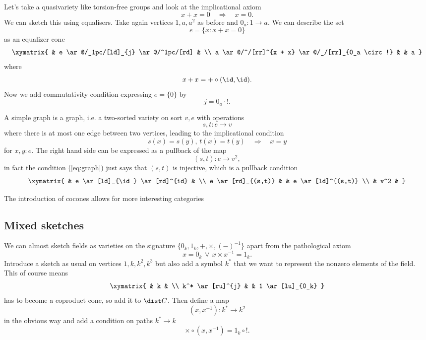 \begin{Example}
Let's take a quasivariety like torsion-free groups and look at the implicational axiom
\[ x + x = 0 \quad \Rightarrow \quad x = 0. \]
We can sketch this using equalisers. Take again vertices $1,a,a^2$ as before and $0_a : 1 \to a$. We can describe the set
\[ e = \{ x : x + x = 0 \} \]
as an equalizer cone
\[
\xymatrix{
& e \ar@/_1pc/[ld]_{j} \ar@/^1pc/[rd] & \\
a \ar@/^/[rr]^{x + x} \ar@/_/[rr]_{0_a \circ !} & & a
}\]
where \[ x + x = + \circ (\id,\id). \]
Now we add commutativity condition expressing $e = \{0\}$ by \[ j = 0_a\cdot !. \]
\end{Example}

\begin{Example}
A simple graph is a graph, i.e. a two-sorted variety on sort $v,e$ with operations
\[ s, t : e \to v \]
where there is at most one edge between two vertices, leading to the implicational condition
\begin{equation}\label{eq:graph} s(x) = s(y),\, t(x) = t(y) \quad \Rightarrow \quad x = y \end{equation}
for $x,y : e$. The right hand side can be expressed as a pullback of the map \[ (s,t) : e \to v^2, \]
in fact the condition (\ref{eq:graph}) just says that $(s,t)$ is injective, which is a pullback condition
\[
\xymatrix{
 & e \ar[ld]_{\id} \ar[rd]^{id} & \\
e \ar[rd]_{(s,t)} &  & e \ar[ld]^{(s,t)} \\
 & v^2 &
}\]
\end{Example}

The introduction of cocones allows for more interesting categories
\subsection{Mixed sketches}

\begin{Example}[Fields]
We can almost sketch fields as varieties on the signature $\{0_k,1_k,+,\times,(-)^{-1}\}$ apart from the pathological axiom
\[ x = 0_k \,\vee\,x \times x^{-1} = 1_k. \] 
Introduce a sketch as usual on vertices $1,k,k^2,k^3$ but also add a symbol $k^*$ that we want to represent the nonzero elements of the field. This of course means
\[
\xymatrix{
& k & \\
k^* \ar[ru]^{j} & & 1 \ar[lu]_{0_k}
}\]
has to become a coproduct cone, so add it to $\dist C$. Then define a map 
\[ (x,x^{-1}) : k^* \to k^2 \]
in the obvious way and add a condition on paths $k^* \to k$
\[ \times \circ (x,x^{-1}) = 1_k \circ !. \]
\end{Example}

